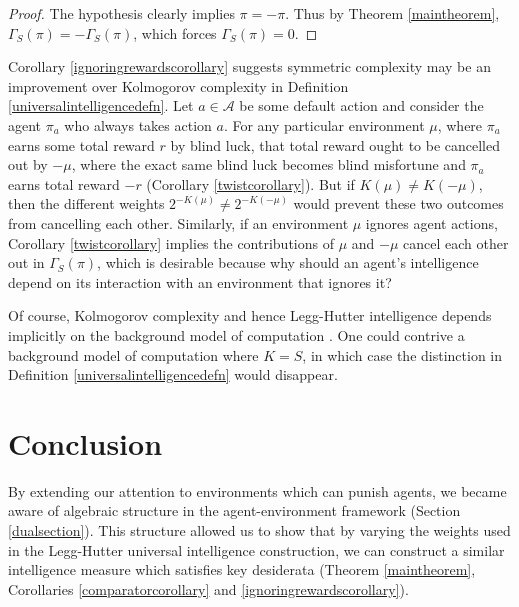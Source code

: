 \documentclass{article}
\def\SYM{S}
\begin{document}
\begin{proof}
    The hypothesis clearly implies $\pi=-\pi$. Thus by Theorem
    \ref{maintheorem}, $\Gamma_{\SYM}(\pi)=-\Gamma_{\SYM}(\pi)$,
    which forces $\Gamma_{\SYM}(\pi)=0$.
\end{proof}

Corollary \ref{ignoringrewardscorollary} suggests
symmetric complexity may be an improvement over Kolmogorov complexity
in Definition \ref{universalintelligencedefn}.
Let $a\in\mathcal A$ be some default action and consider the
agent $\pi_a$ who always takes action $a$. For any particular environment $\mu$,
where $\pi_a$ earns some total reward $r$ by blind luck,
that total reward ought to be cancelled out by $-\mu$, where
the exact same blind luck becomes blind misfortune and $\pi_a$ earns total reward
$-r$ (Corollary \ref{twistcorollary}). But if $K(\mu)\not=K(-\mu)$,
then the different weights $2^{-K(\mu)}\not=2^{-K(-\mu)}$ would prevent
these two outcomes from cancelling each other. Similarly, if an environment
$\mu$ ignores agent actions, Corollary \ref{twistcorollary} implies
the contributions of $\mu$ and $-\mu$ cancel each other out in $\Gamma_{\SYM}(\pi)$,
which is desirable because why should an agent's intelligence depend on
its interaction with an environment that ignores it?

Of course, Kolmogorov complexity and hence Legg-Hutter intelligence depends
implicitly on the background model of computation \cite{leike2015bad}.
One could contrive a background model of computation where $K=S$,
in which case the distinction in
Definition \ref{universalintelligencedefn} would disappear.

\section{Conclusion}
\label{conclusionsecn}

By extending our attention to environments which can punish agents,
we became aware of algebraic structure in the agent-environment
framework (Section \ref{dualsection}). This structure allowed us to
show that by varying the weights used in the Legg-Hutter universal
intelligence construction, we can construct a similar intelligence
measure which satisfies key desiderata (Theorem \ref{maintheorem},
Corollaries \ref{comparatorcorollary} and \ref{ignoringrewardscorollary}).
\end{document}
